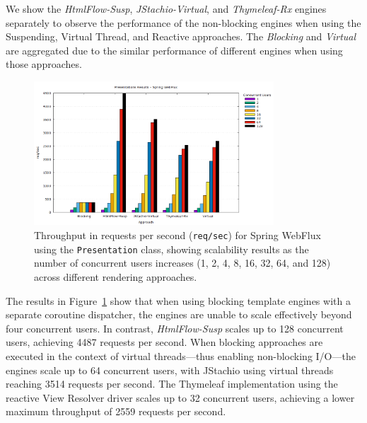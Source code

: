 \documentclass[software,article,accept,pdftex,moreauthors]{Definitions/mdpi}
\begin{document}

We show the \textit{HtmlFlow-Susp}, \textit{JStachio-Virtual}, and
\textit{Thymeleaf-Rx} engines separately to observe the performance of the
non-blocking engines when using the Suspending, Virtual Thread, and Reactive
approaches. The \textit{Blocking} and \textit{Virtual} are aggregated due to
the similar performance of different engines when using those approaches.

\begin{figure}[H]
\vspace{-6pt}
     \includegraphics[width=0.8\textwidth]{./Graphs/presentations-webflux-jmeter.png}
     \caption{Throughput in requests per second (\texttt{req/sec}) for Spring
WebFlux using the \texttt{Presentation} class, showing scalability results as
the number of concurrent users increases (1, 2, 4, 8, 16, 32, 64, and 128)
across different rendering approaches.}
    \label{fig:presentations-webflux-jmeter}
\end{figure}

The results in Figure~\ref{fig:presentations-webflux-jmeter} show that when
using blocking template engines with a separate coroutine dispatcher, the
engines are unable to scale effectively beyond four concurrent users. In contrast,
\textit{HtmlFlow-Susp} scales up to 128 concurrent users, achieving 4487
requests per second. When blocking approaches are executed in the context of
virtual threads---thus enabling non-blocking I/O---the engines scale up to 64
concurrent users, with JStachio using virtual threads reaching 3514 requests
per second. The Thymeleaf implementation using the reactive View Resolver
driver scales up to 32 concurrent users, achieving a lower maximum throughput
of 2559 requests per second.
\end{document}
